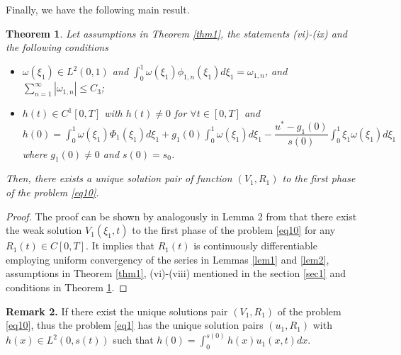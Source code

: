 \documentclass[preprint,12pt,authoryear]{elsarticle}
\newtheorem{theorem}{Theorem}
\begin{document}
Finally, we have the following main result.
\begin{theorem}\label{thm3}
    Let assumptions in Theorem \ref{thm1}, the statements (vi)-(ix) and the following conditions
    \begin{itemize}
        \item[1.] $\omega(\xi_1)\in L^2(0,1)$ and $\int_0^1\omega(\xi_1)\phi_{1,n}(\xi_1)d\xi_1=\omega_{1,n}$, and $\sum_{n=1}^{\infty}|\omega_{1,n}|\leq C_3$;
        \item[2.] $h(t)\in C^1[0,T]$ with $h(t)\neq 0$ for $\forall t\in[0,T]$ and $h(0)=\int_0^1\omega(\xi_1)\Phi_1(\xi_1)d\xi_1+g_1(0)\int_0^1\omega(\xi_1)d\xi_1-\dfrac{u^*-g_1(0)}{s(0)}\int_0^1\xi_1\omega(\xi_1)d\xi_1$ where $g_1(0)\neq 0$ and $s(0)=s_0$. 
    \end{itemize}
    Then, there exists a unique solution pair of function $(V_1,R_1)$ to the first phase of the problem \eqref{eq10}.
\end{theorem}
\begin{proof}
    The proof can be shown by analogously in Lemma 2 from \cite{20} that there exist the weak solution $V_1(\xi_1,t)$ to the first phase of the problem \eqref{eq10} for any $R_1(t)\in C[0,T]$. It implies that $R_1(t)$ is continuously differentiable employing uniform convergency of the series in Lemmas \ref{lem1} and \ref{lem2}, assumptions in Theorem \ref{thm1}, (vi)-(viii) mentioned in the section \ref{sec1} and conditions in Theorem \ref{thm3}.
\end{proof}
\textbf{Remark 2.} If there exist the unique solutions pair $(V_1,R_1)$ of the problem \eqref{eq10}, thus the problem \eqref{eq1} has the unique solution pairs $(u_1,R_1)$ with $h(x)\in L^2(0,s(t))$ such that $h(0)=\int_0^{s(0)}h(x)u_1(x,t)dx$.
\end{document}
